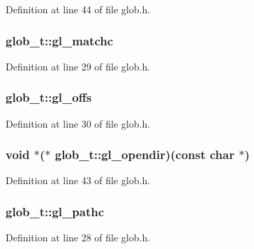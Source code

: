 Definition at line 44 of file glob.\-h.

\hypertarget{structglob__t_af8d4b3ef84b97cd7779c69f3ef6bc1f2}{
\subsubsection[{gl\-\_\-matchc}]{ glob\-\_\-t\-::gl\-\_\-matchc}}\label{structglob__t_af8d4b3ef84b97cd7779c69f3ef6bc1f2}


Definition at line 29 of file glob.\-h.

\hypertarget{structglob__t_ada6945e8f6ca53ecf82c9d736fb5307e}{
\subsubsection[{gl\-\_\-offs}]{ glob\-\_\-t\-::gl\-\_\-offs}}\label{structglob__t_ada6945e8f6ca53ecf82c9d736fb5307e}


Definition at line 30 of file glob.\-h.

\hypertarget{structglob__t_aa980e1d696fb49bc71c7e030a646525f}{
\subsubsection[{gl\-\_\-opendir}]{\setlength{\rightskip}{0pt plus 5cm}void $\ast$($\ast$ glob\-\_\-t\-::gl\-\_\-opendir)(const char $\ast$)}}\label{structglob__t_aa980e1d696fb49bc71c7e030a646525f}


Definition at line 43 of file glob.\-h.

\hypertarget{structglob__t_a69dc492f370a9793f06c11e3eb12f199}{
\subsubsection[{gl\-\_\-pathc}]{ glob\-\_\-t\-::gl\-\_\-pathc}}\label{structglob__t_a69dc492f370a9793f06c11e3eb12f199}


Definition at line 28 of file glob.\-h.

